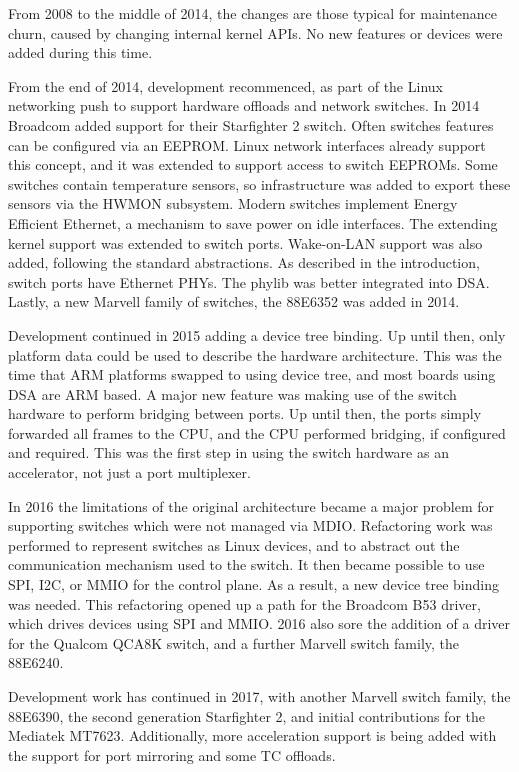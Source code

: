 \documentclass[letterpaper]{article}
\begin{document}
From 2008 to the middle of 2014, the changes are those typical for
maintenance churn, caused by changing internal kernel APIs. No new
features or devices were added during this time.

From the end of 2014, development recommenced, as part of the Linux
networking push to support hardware offloads and network switches. In
2014 Broadcom added support for their Starfighter 2 switch. Often
switches features can be configured via an EEPROM. Linux network
interfaces already support this concept, and it was extended to
support access to switch EEPROMs. Some switches contain temperature
sensors, so infrastructure was added to export these sensors via the
HWMON subsystem. Modern switches implement Energy Efficient Ethernet,
a mechanism to save power on idle interfaces. The extending kernel
support was extended to switch ports. Wake-on-LAN support was also
added, following the standard abstractions. As described in the
introduction, switch ports have Ethernet PHYs. The phylib was better
integrated into DSA. Lastly, a new Marvell family of switches, the
88E6352 was added in 2014.

Development continued in 2015 adding a device tree binding. Up until
then, only platform data could be used to describe the hardware
architecture. This was the time that ARM platforms swapped to using
device tree, and most boards using DSA are ARM based. A major new
feature was making use of the switch hardware to perform bridging
between ports. Up until then, the ports simply forwarded all frames to
the CPU, and the CPU performed bridging, if configured and
required. This was the first step in using the switch hardware as an
accelerator, not just a port multiplexer.

In 2016 the limitations of the original architecture became a major
problem for supporting switches which were not managed via
MDIO. Refactoring work was performed to represent switches as Linux
devices, and to abstract out the communication mechanism used to the
switch. It then became possible to use SPI, I2C, or MMIO for the
control plane. As a result, a new device tree binding was needed. This
refactoring opened up a path for the Broadcom B53 driver, which drives
devices using SPI and MMIO. 2016 also sore the addition of a driver
for the Qualcom QCA8K switch, and a further Marvell switch family, the
88E6240.

Development work has continued in 2017, with another Marvell switch
family, the 88E6390, the second generation Starfighter 2, and
initial contributions for the Mediatek MT7623. Additionally, more
acceleration support is being added with the support for port
mirroring and some TC offloads.
\end{document}
